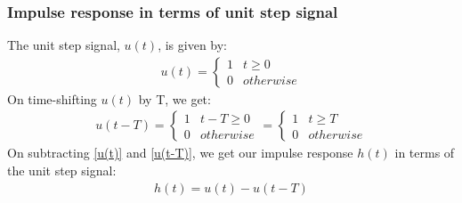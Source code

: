 \documentclass{beamer}
\begin{document}
\begin{frame}
    \frametitle{Impulse response in terms of unit step signal}
    \begin{flushleft}
    The unit step signal, $u(t)$, is given by:
\begin{align}
    u(t) = 
    \begin{cases}
    1 & t\geq0\\
    0 & otherwise
    \end{cases}
    \label{u(t)}
\end{align}
On time-shifting $u(t)$ by T, we get:
\begin{align}
     u(t - T) = 
    \begin{cases}
    1 & t-T\geq 0\\
    0 & otherwise
    \end{cases}
    = 
    \begin{cases}
    1 & t\geq T\\
    0 & otherwise
    \end{cases}
    \label{u(t-T)}
\end{align}
On subtracting \eqref{u(t)} and \eqref{u(t-T)}, we get our impulse response $h(t)$ in terms of the unit step signal:
\begin{align}
    h(t) = u(t) - u(t-T)
\end{align}
    \end{flushleft}
\end{frame}
\end{document}
